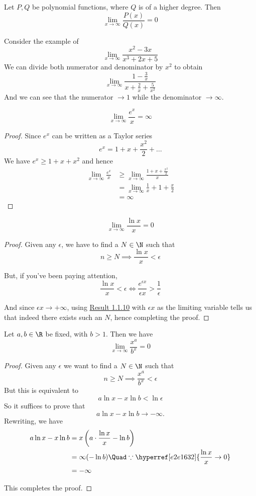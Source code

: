 Let $P,Q$ be polynomial functions, where $Q$ is of a higher degree.
Then
$$
	\lim_{x\to\infty}\frac{P(x)}{Q(x)}=0
$$

\begin{compute}
	Consider the example of
	$$
		\lim_{x\to\infty}\frac{x^2 - 3x}{x^3 + 2x + 5}
	$$
	We can divide both numerator and denominator by $x^2$ to obtain
	$$
		\lim_{x\to\infty}\frac{1 - \frac3x}{x + \frac2x + \frac5{x^2}}
	$$
	And we can see that the numerator $\to1$ while the denominator
	$\to\infty$.
\end{compute}

\label{b905ee7}
$$
	\lim_{x\to\infty}\frac{e^x}x=\infty
$$

\begin{proof}
	Since $e^x$ can be written as a Taylor series
	$$
		e^x=1 + x + \frac{x^2}2 +\ldots
	$$
	We have $e^x\geq 1 + x + x^2$ and hence
	\begin{align*}
		\lim_{x\to\infty}\frac{e^x}x
		 & \geq\lim_{x\to\infty}\frac{1+x+\frac{x^2}2}x \\
		 & =\lim_{x\to\infty}\frac1x + 1 + \frac{x}2    \\
		 & = \infty
	\end{align*}
\end{proof}


\label{e2e1632}
$$
	\lim_{x\to\infty}\frac{\ln x}x = 0
$$

\begin{proof}
	Given any $\epsilon$, we have to find a $N\in\N$ such that
	$$
		n\geq N\implies\frac{\ln x}x<\epsilon
	$$

	But, if you've been paying attention,
	$$
		\frac{\ln x}x<\epsilon\iff\frac{e^{\epsilon x}}{\epsilon x}>\frac1\epsilon
	$$

	And since $\epsilon x\to+\infty$, using \hyperref[b905ee7]{Result
		1.1.10} with $\epsilon x$ as the limiting variable tells us that
	indeed there exists such an $N$, hence completing the proof.
\end{proof}

\label{f3540b0}

Let $a,b\in\R$ be fixed, with $b>1$. Then we have
$$
	\lim_{x\to\infty}\frac{x^a}{b^x}=0
$$

\begin{proof}
	Given any $\epsilon$ we want to find a $N\in\N$ such that
	$$
		n\geq N\implies\frac{x^a}{b^x}<\epsilon
	$$
	But this is equivalent to
	$$
		a\ln x-x\ln b<\ln\epsilon
	$$
	So it suffices to prove that
	$$
		a\ln x-x\ln b\to-\infty.
	$$
	Rewriting, we have
	\begin{align*}
		a\ln x-x\ln b
		 & = x\left(a\cdot\frac{\ln x}{x}-\ln b\right)                           \\
		 & = \infty(-\ln b) \Quad\because\hyperref[e2e1632]{\frac{\ln x}{x}\to0} \\
		 & = -\infty
	\end{align*}

	This completes the proof.
\end{proof}

